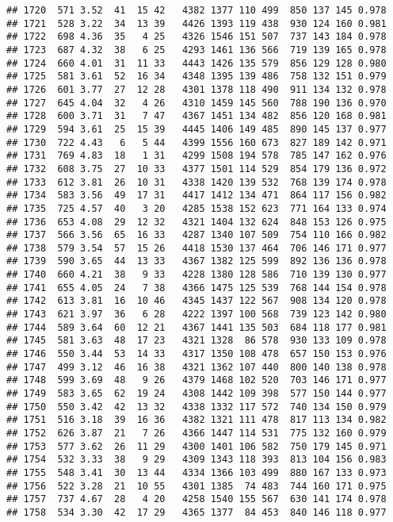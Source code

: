 \documentclass[]{article}
\begin{document}
\begin{verbatim}
## 1720  571 3.52  41  15 42   4382 1377 110 499  850 137 145 0.978
## 1721  528 3.22  34  13 39   4426 1393 119 438  930 124 160 0.981
## 1722  698 4.36  35   4 25   4326 1546 151 507  737 143 184 0.978
## 1723  687 4.32  38   6 25   4293 1461 136 566  719 139 165 0.978
## 1724  660 4.01  31  11 33   4443 1426 135 579  856 129 128 0.980
## 1725  581 3.61  52  16 34   4348 1395 139 486  758 132 151 0.979
## 1726  601 3.77  27  12 28   4301 1378 118 490  911 134 132 0.978
## 1727  645 4.04  32   4 26   4310 1459 145 560  788 190 136 0.970
## 1728  600 3.71  31   7 47   4367 1451 134 482  856 120 168 0.981
## 1729  594 3.61  25  15 39   4445 1406 149 485  890 145 137 0.977
## 1730  722 4.43   6   5 44   4399 1556 160 673  827 189 142 0.971
## 1731  769 4.83  18   1 31   4299 1508 194 578  785 147 162 0.976
## 1732  608 3.75  27  10 33   4377 1501 114 529  854 179 136 0.972
## 1733  612 3.81  26  10 31   4338 1420 139 532  768 139 174 0.978
## 1734  583 3.56  49  17 31   4417 1412 134 471  864 117 156 0.982
## 1735  725 4.57  40   3 20   4285 1538 152 623  771 164 133 0.974
## 1736  653 4.08  29  12 32   4321 1404 132 624  848 153 126 0.975
## 1737  566 3.56  65  16 33   4287 1340 107 509  754 110 166 0.982
## 1738  579 3.54  57  15 26   4418 1530 137 464  706 146 171 0.977
## 1739  590 3.65  44  13 33   4367 1382 125 599  892 136 136 0.978
## 1740  660 4.21  38   9 33   4228 1380 128 586  710 139 130 0.977
## 1741  655 4.05  24   7 38   4366 1475 125 539  768 144 154 0.978
## 1742  613 3.81  16  10 46   4345 1437 122 567  908 134 120 0.978
## 1743  621 3.97  36   6 28   4222 1397 100 568  739 123 142 0.980
## 1744  589 3.64  60  12 21   4367 1441 135 503  684 118 177 0.981
## 1745  581 3.63  48  17 23   4321 1328  86 578  930 133 109 0.978
## 1746  550 3.44  53  14 33   4317 1350 108 478  657 150 153 0.976
## 1747  499 3.12  46  16 38   4321 1362 107 440  800 140 138 0.978
## 1748  599 3.69  48   9 26   4379 1468 102 520  703 146 171 0.977
## 1749  583 3.65  62  19 24   4308 1442 109 398  577 150 144 0.977
## 1750  550 3.42  42  13 32   4338 1332 117 572  740 134 150 0.979
## 1751  516 3.18  39  16 36   4382 1321 111 478  817 113 134 0.982
## 1752  626 3.87  21   7 26   4366 1447 114 531  775 132 160 0.979
## 1753  577 3.62  26  11 29   4300 1401 106 582  750 179 145 0.971
## 1754  532 3.33  38   9 29   4309 1343 118 393  813 104 156 0.983
## 1755  548 3.41  30  13 44   4334 1366 103 499  880 167 133 0.973
## 1756  522 3.28  21  10 55   4301 1385  74 483  744 160 171 0.975
## 1757  737 4.67  28   4 20   4258 1540 155 567  630 141 174 0.978
## 1758  534 3.30  42  17 29   4365 1377  84 453  840 146 118 0.977

\end{verbatim}
\end{document}
